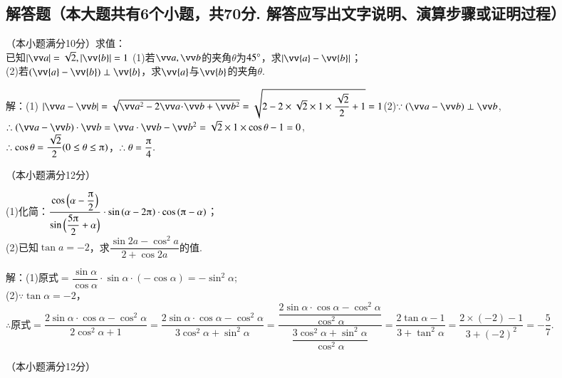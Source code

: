\begin{exercise}
  \section{解答题（本大题共有6个小题，共70分. 解答应写出文字说明、演算步骤或证明过程）}
    \item
      （本小题满分10分）求值：\\
      已知$\abs{\vv a}=\sqrt2,\abs{\vv{\mathstrut b}}=1$
      (1)若$\vv a,\vv b$的夹角$\theta$为$45\degree$，求$\abs{\vv{\mathstrut a}-\vv{\mathstrut b}}$；\\
      (2)若$(\vv{\mathstrut a}-\vv{\mathstrut b})\perp \vv{\mathstrut b}$，求$\vv{\mathstrut a}$与$\vv{\mathstrut b}$的夹角$\theta$.
      \begin{answer}
        解：(1) $\abs{\vv a-\vv b}=\sqrt{\vv a^2-2\vv a\!\cdot\!\vv b+\vv b^2}=\sqrt{2-2\times\sqrt2\times1\times\dfrac{\sqrt2}2+1}=1$\fz[5]
        (2)$\because(\vv a-\vv b)\perp\vv b$,\\
        $\therefore(\vv a-\vv b)\cdot\vv b=\vv a\cdot\vv b-\vv b^2=\sqrt2\times1\times\cos\theta-1=0$,\\
        $\therefore\cos\theta=\dfrac{\sqrt2}2(0\le\theta\le\piup)$，$\therefore\theta=\dfrac{\piup}4.$\fz[10]
      \end{answer}
    \vspace{3cm}
    \clearpage
    \item
      （本小题满分12分）\par
      (1)化简：$\dfrac{\cos{\Bigl(\alpha-\dfrac{\piup}2\Bigr)}}{\sin{\Bigl(\dfrac{5\piup}2+\alpha\Bigr)}}\cdot\sin{(\alpha-2\piup)}\cdot\cos{(\piup-\alpha)}$；\\
      (2)已知$\tan{a}=-2$，求$\dfrac{\sin{2a}-\cos^2{a}}{2+\cos{2a}}$的值.
      \begin{answer}
      解：(1)$\text{原式}=\dfrac{\sin\alpha}{\cos\alpha}\cdot\sin\alpha\cdot(-\cos\alpha)=-\sin^2\alpha$;\\
      (2)$\because\tan\alpha=-2$，
      $\therefore\text{原式}=\dfrac{2\sin\alpha\cdot\cos\alpha-\cos^2\alpha}{2\cos^2\alpha+1}
      =\dfrac{2\sin\alpha\cdot\cos\alpha-\cos^2\alpha}{3\cos^2\alpha+\sin^2\alpha}
      =\dfrac{\dfrac{2\sin\alpha\cdot\cos\alpha-\cos^2\alpha}{\cos^2\alpha}}{\dfrac{3\cos^2\alpha+\sin^2\alpha}{\cos^2\alpha}}
      =\dfrac{2\tan\alpha-1}{3+\tan^2\alpha}=\dfrac{2\times(-2)-1}{3+(-2)^2}
      =-\dfrac{5}{7}.$
      \end{answer}
    \vspace{3cm}
    \item
      （本小题满分12分）\\

\end{exercise}
